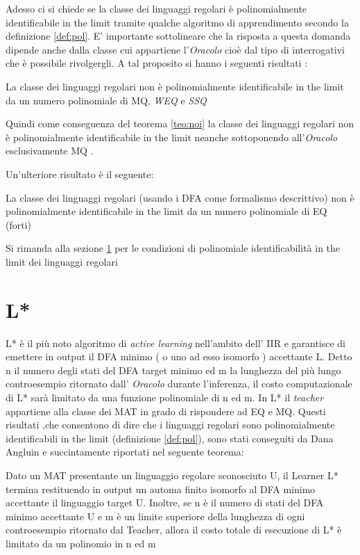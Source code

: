 Adesso ci si chiede se la classe dei linguaggi regolari è polinomialmente identificabile in the limit tramite qualche algoritmo di apprendimento secondo la definizione \ref{def:pol}. E' importante sottolineare che la risposta a questa domanda dipende anche dalla classe cui appartiene l'\textit{Oracolo} cioè dal tipo di interrogativi che è possibile rivolgergli.  A tal proposito si hanno i seguenti risultati :
\begin{teorema}
\label{teo:noi}
La classe dei linguaggi regolari  non è polinomialmente identificabile in the limit da un numero polinomiale di \ac{MQ}, \textit{WEQ} e \textit{SSQ}
\end{teorema}
Quindi come conseguenza del teorema \ref{teo:noi}   la classe dei linguaggi regolari non è polinomialmente identificabile in the limit  neanche sottoponendo all'\textit{Oracolo} esclusivamente \ac{MQ} .

Un'ulteriore risultato è il seguente: 
\begin{teorema}
\label{teo:noe}
La classe dei linguaggi regolari (usando i \ac{DFA} come formalismo descrittivo)  non è polinomialmente identificabile in the limit da un numero polinomiale di \ac{EQ} (forti)
\end{teorema}
Si rimanda alla sezione \ref{sec:lstar} per le condizioni di polinomiale identificabilità in the limit dei linguaggi regolari
\section{L*}
\label{sec:lstar}
L* è il più noto algoritmo di \textit{active learning} nell'ambito dell' \ac{IIR} e garantisce di emettere in output il DFA minimo ( o uno ad esso isomorfo ) accettante \ac{L}. Detto n il numero degli stati del DFA target minimo ed m la lunghezza del più lungo controesempio ritornato dall' \textit{Oracolo} durante l'inferenza, il costo computazionale di L* sarà limitato da una funzione polinomiale di n ed m. In L* il \textit{teacher} appartiene alla classe dei \ac{MAT} in grado di rispondere ad \ac{EQ} e \ac{MQ}. Questi risultati ,che consentono di dire che i linguaggi regolari sono polinomialmente identificabili in the limit (definizione \ref{def:pol}),  sono stati conseguiti da Dana Angluin \cite{Angluin87} e succintamente riportati nel seguente teorema:
\begin{teorema}
Dato un \ac{MAT}  presentante un linguaggio regolare sconosciuto U, il Learner L* termina restituendo in output un automa finito isomorfo al DFA minimo accettante  il linguaggio target U. Inoltre, se n è il numero di stati del DFA minimo accettante U e  m è un limite superiore della lunghezza di ogni controesempio ritornato dal Teacher, allora il costo totale di esecuzione di L* è limitato da un polinomio in n ed m 
\end{teorema}

